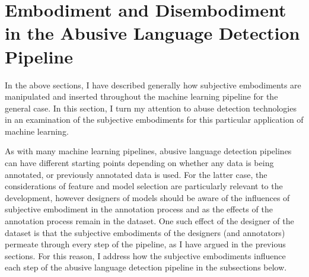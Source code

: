 {\section{Embodiment and Disembodiment in the Abusive Language Detection Pipeline}
In the above sections, I have described generally how subjective embodiments are manipulated and inserted throughout the machine learning pipeline for the general case.
In this section, I turn my attention to abuse detection technologies in an examination of the subjective embodiments for this particular application of machine learning.

As with many machine learning pipelines, abusive language detection pipelines can have different starting points depending on whether any data is being annotated, or previously annotated data is used.
For the latter case, the considerations of feature and model selection are particularly relevant to the development, however designers of models should be aware of the influences of subjective embodiment in the annotation process and as the effects of the annotation process remain in the dataset.
One such effect of the designer of the dataset is that the subjective embodiments of the designers (and annotators) permeate through every step of the pipeline, as I have argued in the previous sections.
For this reason, I address how the subjective embodiments influence each step of the abusive language detection pipeline in the subsections below.

}
